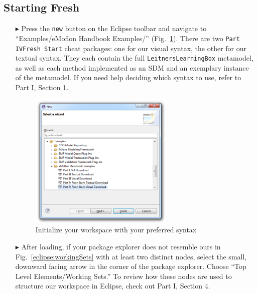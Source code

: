 \subsection{Starting Fresh}
\label{sec:loadSourceMeta}
\begin{itemize}

\item[$\blacktriangleright$] Press the \texttt{new} button on the Eclipse toolbar and navigate to ``Examples/eMoflon Handbook Examples/''
(Fig.~\ref{eclipse:downPartIV}). There are two \texttt{Part IVFresh Start} cheat packages: one for our visual syntax, the other for our textual
syntax. They each contain the full \texttt{LeitnersLearningBox} metamodel, as well as each method implemented as an SDM and an exemplary instance of the
metamodel. If you need help deciding which syntax to use, refer to Part I, Section 1.

\begin{figure}[htbp]
\begin{center}
  \includegraphics[width=0.65\textwidth]{eclipse_part4FreshWizardDownload}
  \caption{Initialize your workspace with your preferred syntax}
  \label{eclipse:downPartIV}
\end{center}
\end{figure}

\vspace{0.5cm}

\item[$\blacktriangleright$] After loading, if your package explorer does not resemble ours in Fig.~\ref{eclipse:workingSets} with at least two distinct nodes,
select the small, downward facing arrow in the corner of the package explorer. Choose ``Top Level Elements/Working Sets.'' To review how these nodes are used
to structure our workspace in Eclipse, check out Part I, Section 4.


\end{itemize}
